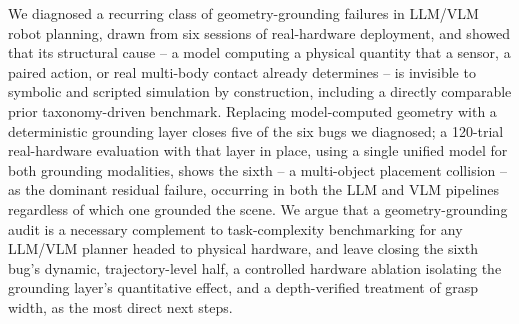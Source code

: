 We diagnosed a recurring class of geometry-grounding failures in LLM/VLM
robot planning, drawn from six sessions of real-hardware deployment, and
showed that its structural cause -- a model computing a physical quantity
that a sensor, a paired action, or real multi-body contact already
determines -- is invisible to symbolic and scripted simulation by
construction, including a directly comparable prior taxonomy-driven
benchmark. Replacing model-computed geometry with a deterministic
grounding layer closes five of the six bugs we diagnosed; a 120-trial
real-hardware evaluation with that layer in place, using a single unified
model for both grounding modalities, shows the sixth -- a multi-object
placement collision -- as the dominant residual failure, occurring in
both the LLM and VLM pipelines regardless of which one grounded the
scene. We argue that a geometry-grounding audit is a necessary complement
to task-complexity benchmarking for any LLM/VLM planner headed to
physical hardware, and leave closing the sixth bug's dynamic,
trajectory-level half, a controlled hardware ablation isolating the
grounding layer's quantitative effect, and a depth-verified treatment of
grasp width, as the most direct next steps.
